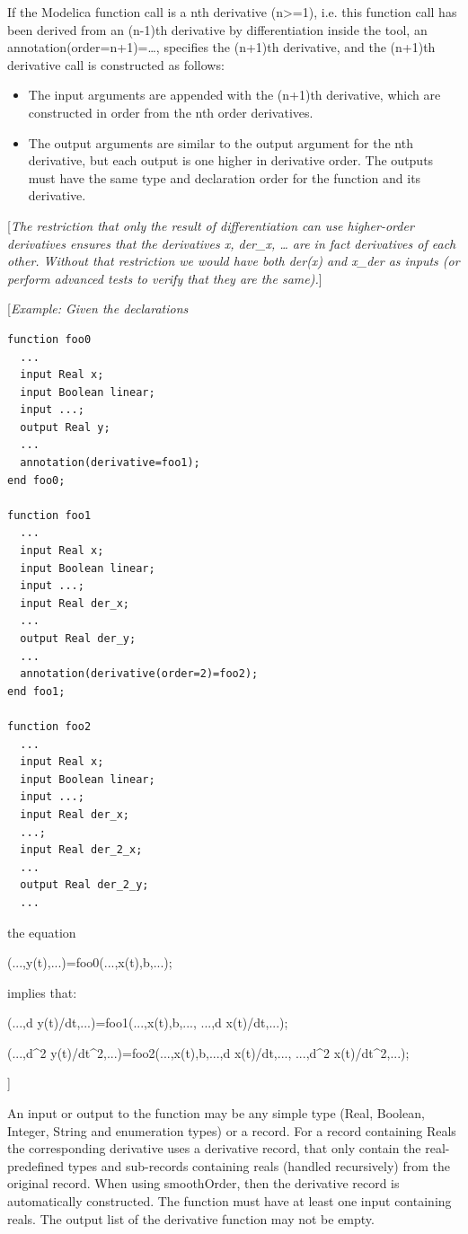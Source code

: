 \documentclass[10pt,a4paper]{report}
\begin{document}
If the Modelica function call is a nth derivative (n\textgreater{}=1),
i.e. this function call has been derived from an (n-1)th derivative by
differentiation inside the tool, an annotation(order=n+1)=\ldots{},
specifies the (n+1)th derivative, and the (n+1)th derivative call is
constructed as follows:

\begin{itemize}
\item
  The input arguments are appended with the (n+1)th derivative, which
  are constructed in order from the nth order derivatives.
\item
  The output arguments are similar to the output argument for the nth
  derivative, but each output is one higher in derivative order. The
  outputs must have the same type and declaration order for the function
  and its derivative.
\end{itemize}

{[}\emph{The restriction that only the result of differentiation can use
higher-order derivatives ensures that the derivatives x, der\_x,
\ldots{} are in fact derivatives of each other. Without that restriction
we would have both der(x) and x\_der as inputs (or perform advanced
tests to verify that they are the same).}{]}

{[}\emph{Example: Given the declarations}

\begin{lstlisting}[language=modelica]
function foo0
  ...
  input Real x;
  input Boolean linear;
  input ...;
  output Real y;
  ...
  annotation(derivative=foo1);
end foo0;

function foo1
  ...
  input Real x;
  input Boolean linear;
  input ...;
  input Real der_x;
  ...
  output Real der_y;
  ...
  annotation(derivative(order=2)=foo2);
end foo1;

function foo2
  ...
  input Real x;
  input Boolean linear;
  input ...;
  input Real der_x;
  ...;
  input Real der_2_x;
  ...
  output Real der_2_y;
  ...
\end{lstlisting}
the equation

(...,y(t),...)=foo0(...,x(t),b,...);

implies that:

(...,d y(t)/dt,...)=foo1(...,x(t),b,..., ...,d x(t)/dt,...);

(...,d\^{}2 y(t)/dt\^{}2,...)=foo2(...,x(t),b,...,d x(t)/dt,...,
...,d\^{}2 x(t)/dt\^{}2,...);

{]}

An input or output to the function may be any simple type (Real,
Boolean, Integer, String and enumeration types) or a record. For a
record containing Reals the corresponding derivative uses a derivative
record, that only contain the real-predefined types and sub-records
containing reals (handled recursively) from the original record. When
using smoothOrder, then the derivative record is automatically
constructed. The function must have at least one input containing reals.
The output list of the derivative function may not be empty.
\end{document}
